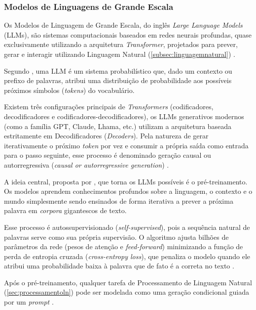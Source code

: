 \documentclass[
    12pt,                %
    openright,           %
    oneside,             %
    a4paper,             %
    english,             %
    brazil               %
]{abntex2}
\begin{document}
\begin{itemize}
\subsubsection{Modelos de Linguagens de Grande Escala}
\label{subsec:llm}
\par
Os Modelos de Linguagem de Grande Escala, do inglês \textit{Large Language Models} (LLMs), são sistemas computacionais baseados em redes neurais profundas, quase exclusivamente utilizando a arquitetura \textit{Transformer}, projetados para prever, gerar e interagir utilizando Linguagem Natural (\ref{subsec:linguagemnatural}) \cite{jurafsky2026speech}.
\par
Segundo , uma LLM é um sistema probabilístico que, dado um contexto ou prefixo de palavras, atribui uma distribuição de probabilidade aos possíveis próximos símbolos (\textit{tokens}) do vocabulário.
\par
Existem três configurações principais de \textit{Transformers} (codificadores, decodificadores e codificadores-decodificadores), os LLMs generativos modernos (como a família GPT, Claude, Lhama, etc.) utilizam a arquitetura baseada estritamente em Decodificadores (\textit{Decoders}).
Pela natureza de gerar iterativamente o próximo \textit{token} por vez e consumir a própria saída como entrada para o passo seguinte, esse processo é denominado geração causal ou autorregressiva (\textit{causal or autorregressive generation}) \cite{jurafsky2026speech}.
\par
A ideia central, proposta por , que torna os LLMs possíveis é o pré-treinamento.
Os modelos aprendem conhecimentos profundos sobre a linguagem, o contexto e o mundo simplesmente sendo ensinados de forma iterativa a prever a próxima palavra em \textit{corpora} gigantescos de texto.
\par
Esse processo é autossupervisionado (\textit{self-supervised}), pois a sequência natural de palavras serve como sua própria supervisão.
O algoritmo ajusta bilhões de parâmetros da rede (pesos de atenção e \textit{feed-forward}) minimizando a função de perda de entropia cruzada (\textit{cross-entropy loss}), que penaliza o modelo quando ele atribui uma probabilidade baixa à palavra que de fato é a correta no texto \cite{jurafsky2026speech}.
\par
Após o pré-treinamento, qualquer tarefa de Processamento de Linguagem Natural (\ref{sec:processamentoln}) pode ser modelada como uma geração condicional guiada por um \textit{prompt} \cite{jurafsky2026speech}.

\end{itemize}
\end{document}
